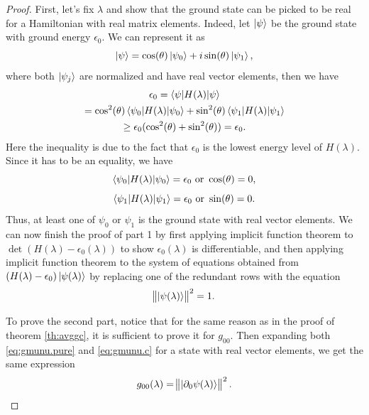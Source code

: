 \documentclass[american,aps,pra,reprint,floatfix,nofootinbib,superscriptaddress]{revtex4-2}
\begin{document}
\begin{proof}
  First, let's fix $\lambda$ and show that the ground state can be picked
  to be real for a Hamiltonian with real matrix elements.
  Indeed, let $\ket{\psi}$ be the ground
  state with ground energy $\epsilon_0$. We can represent it as
  \begin{equation}
    \ket{\psi} = \cos(\theta) \ket{\psi_0} + i\sin(\theta) \ket{\psi_1},
  \end{equation}
  where both $\ket{\psi_j}$ are normalized and have
  real vector elements, then we have
  \begin{multline}
    \epsilon_0 = \braket{\psi|H(\lambda)|\psi} \\
    = \cos^2(\theta) \braket{\psi_0|H(\lambda)|\psi_0}
      + \sin^2(\theta) \braket{\psi_1|H(\lambda)|\psi_1} \\
    \geq \epsilon_0 (\cos^2(\theta) + \sin^2(\theta))
    = \epsilon_0.
  \end{multline}
  Here the inequality is due to the fact that $\epsilon_0$ is the
  lowest energy level of $H(\lambda)$. Since it has to be an equality,
  we have
  \begin{equation}
    \braket{\psi_0|H(\lambda)|\psi_0} = \epsilon_0
      \textrm{ or } \cos(\theta) = 0,
  \end{equation}
  \begin{equation}
    \braket{\psi_1|H(\lambda)|\psi_1} = \epsilon_0
      \textrm{ or } \sin(\theta) = 0.
  \end{equation}
  Thus, at least one of $\psi_0$ or $\psi_1$ is the ground state
  with real vector elements.
  We can now finish the proof of part 1 by first applying implicit function
  theorem to $\det(H(\lambda) - \epsilon_0(\lambda))$ to show
  $\epsilon_0(\lambda)$ is differentiable, and then
  applying implicit function theorem to the system of equations obtained
  from $(H(\lambda) - \epsilon_0) \ket{\psi(\lambda)}$ by replacing
  one of the redundant rows with the equation
  \begin{equation}
    \norm{\ket{\psi(\lambda)}}^2 = 1.
  \end{equation}

  To prove the second part, notice that for the same reason as in the proof
  of theorem \ref{th:avggc}, it is sufficient to prove it for $g_{00}$.
  Then expanding both \eqref{eq:gmunu.pure} and \eqref{eq:gmunu.c} for
  a state with real vector elements, we get the same expression
  \begin{equation}
    g_{00}(\lambda) = \norm{\ket{\partial_0\psi(\lambda)}}^2.
  \end{equation}
\end{proof}
\end{document}
